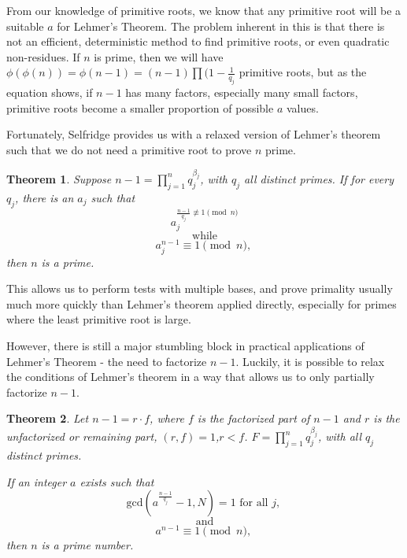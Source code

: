 \documentclass{article}
\newtheorem*{theorem}{Theorem}
\begin{document}
\par From our knowledge of primitive roots, we know that any primitive root will be a suitable $a$ for Lehmer's Theorem. The problem inherent in this is that there is not an efficient, deterministic method to find primitive roots, or even quadratic non-residues. If $n$ is prime, then we will have $\phi(\phi(n)) = \phi(n-1) = (n-1) \prod (1- \frac{1}{q_j}$ primitive roots, but as the equation shows, if $n-1$ has many factors, especially many small factors, primitive roots become a smaller proportion of possible $a$ values.

 \par Fortunately, Selfridge provides us with a relaxed version of Lehmer's theorem such that we do not need a primitive root to prove $n$ prime.
\begin{theorem}
Suppose $n-1 = \prod^n_{j=1} q_j^{\beta_j}$, with $q_j$ all distinct primes.  If for every $q_j$, there is an $a_j$ such that
	$$a_j^{\frac{n-1}{q_j} \not\equiv 1 \pmod n}$$ 
	$$\text{ while }$$
	$$a_j^{n-1} \equiv 1 \pmod n \text{, }$$
then $n$ is a prime.
\end{theorem}
\par This allows us to perform tests with multiple bases, and prove primality usually much more quickly than Lehmer's theorem applied directly, especially for primes where the least primitive root is large.
\par However, there is still a major stumbling block in practical applications of Lehmer's Theorem - the need to factorize $n -1$. Luckily, it is possible to relax the conditions of Lehmer's theorem in a way that allows us to only partially factorize $n-1$.

\begin{theorem}
Let $n - 1 = r \cdot f$, where $f$ is the factorized part of $n-1$ and $r$ is the unfactorized or remaining part, $(r,f) = 1$,$r < f$. $F = \prod^n_{j=1} q_j^{\beta_j}$, with all $q_j$ distinct primes.
\par If an integer $a$ exists such that
	$$\text{gcd}(a^{\frac{n-1}{q_j}} - 1, N) = 1 \text{ for all } j \text{, }$$
	$$\text{ and }$$
	$$a^{n-1} \equiv 1 \pmod n \text{, }$$
then $n$ is a prime number.
\end{theorem}

\end{document}
